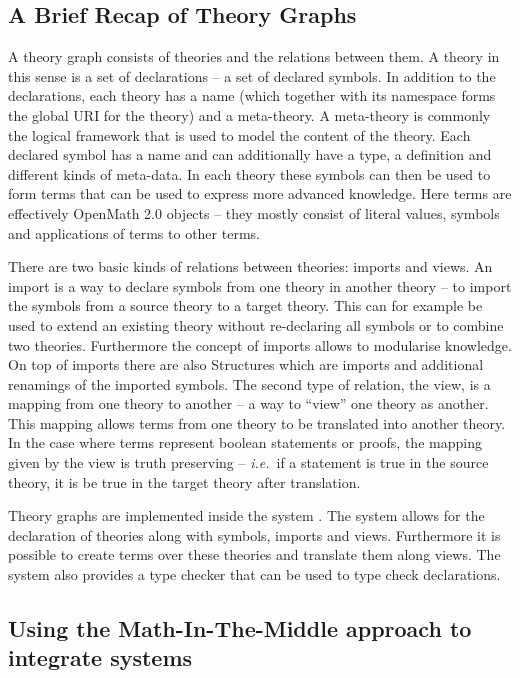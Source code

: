 \subsection{A Brief Recap of Theory Graphs}\label{sec:MMT}

A theory graph consists of theories and the relations between them. A theory in this sense
is a set of declarations -- a set of declared symbols. In addition to the declarations,
each theory has a name (which together with its namespace forms the global URI for the
theory) and a meta-theory. A meta-theory is commonly the logical framework that is used to
model the content of the theory. Each declared symbol has a name and can additionally have
a type, a definition and different kinds of meta-data. In each theory these symbols can
then be used to form terms that can be used to express more advanced knowledge. Here terms
are effectively OpenMath 2.0 \cite{BusCapCar:2oms04} objects -- they mostly consist of
literal values, symbols and applications of terms to other terms.

There are two basic kinds of relations between theories: imports and views. An import is a
way to declare symbols from one theory in another theory -- to import the symbols from a
source theory to a target theory. This can for example be used to extend an existing
theory without re-declaring all symbols or to combine two theories. Furthermore the
concept of imports allows to modularise knowledge. On top of imports there are also
Structures which are imports and additional renamings of the imported symbols. The second
type of relation, the view, is a mapping from one theory to another -- a way to ``view''
one theory as another. This mapping allows terms from one theory to be translated into
another theory. In the case where terms represent boolean statements or proofs, the
mapping given by the view is truth preserving -- \emph{i.e.}~if a statement is true in the
source theory, it is be true in the target theory after translation.

Theory graphs are implemented inside the \MMT system \cite{RabKoh:WSMSML13}. The system
allows for the declaration of theories along with symbols, imports and views. Furthermore
it is possible to create terms over these theories and translate them along views. The
\MMT system also provides a type checker that can be used to type check declarations.

\subsection{Using the Math-In-The-Middle approach to integrate systems}\label{sec:mitm}


